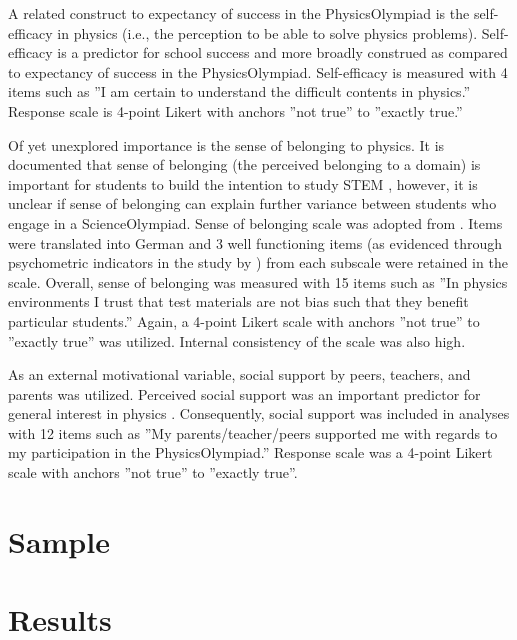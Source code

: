 \documentclass[]{interact}
\begin{document}
A related construct to expectancy of success in the PhysicsOlympiad is the self-efficacy in physics (i.e., the perception to be able to solve physics problems). Self-efficacy is a predictor for school success \citep[e.g.,][]{Britner.2006} and more broadly construed as compared to expectancy of success in the PhysicsOlympiad. Self-efficacy is measured with 4 items such as ''I am certain to understand the difficult contents in physics.'' Response scale is 4-point Likert with anchors ''not true'' to ''exactly true.'' 

Of yet unexplored importance is the sense of belonging to physics. It is documented that sense of belonging (the perceived belonging to a domain) is important for students to build the intention to study STEM \citep{Good.2012}, however, it is unclear if sense of belonging can explain further variance between students who engage in a ScienceOlympiad. Sense of belonging scale was adopted from \cite{Good.2012}. Items were translated into German and 3 well functioning items (as evidenced through psychometric indicators in the study by \cite{Good.2012}) from each subscale were retained in the scale. Overall, sense of belonging was measured with 15 items such as ''In physics environments I trust that test materials are not bias such that they benefit particular students.'' Again, a 4-point Likert scale with anchors ''not true'' to ''exactly true'' was utilized. Internal consistency of the scale was also high.

As an external motivational variable, social support by peers, teachers, and parents was utilized. Perceived social support was an important predictor for general interest in physics \citep{Hoffmann.2002}. Consequently, social support was included in analyses with 12 items such as ''My parents/teacher/peers supported me with regards to my participation in the PhysicsOlympiad.'' Response scale was a 4-point Likert scale with anchors ''not true'' to ''exactly true''.





\section{Sample}



\section{Results}
\end{document}
